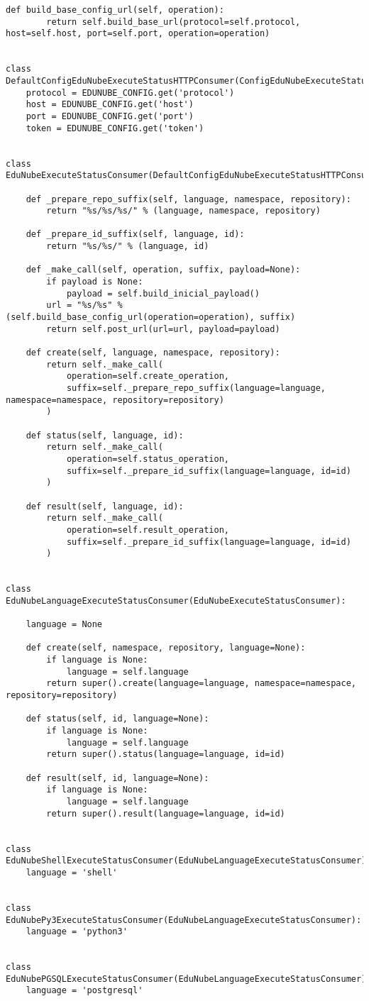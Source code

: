 \begin{lstlisting}[breaklines]
    def build_base_config_url(self, operation):
        return self.build_base_url(protocol=self.protocol, host=self.host, port=self.port, operation=operation)


class DefaultConfigEduNubeExecuteStatusHTTPConsumer(ConfigEduNubeExecuteStatusHTTPConsumer):
    protocol = EDUNUBE_CONFIG.get('protocol')
    host = EDUNUBE_CONFIG.get('host')
    port = EDUNUBE_CONFIG.get('port')
    token = EDUNUBE_CONFIG.get('token')


class EduNubeExecuteStatusConsumer(DefaultConfigEduNubeExecuteStatusHTTPConsumer):

    def _prepare_repo_suffix(self, language, namespace, repository):
        return "%s/%s/%s/" % (language, namespace, repository)

    def _prepare_id_suffix(self, language, id):
        return "%s/%s/" % (language, id)

    def _make_call(self, operation, suffix, payload=None):
        if payload is None:
            payload = self.build_inicial_payload()
        url = "%s/%s" % (self.build_base_config_url(operation=operation), suffix)
        return self.post_url(url=url, payload=payload)

    def create(self, language, namespace, repository):
        return self._make_call(
            operation=self.create_operation,
            suffix=self._prepare_repo_suffix(language=language, namespace=namespace, repository=repository)
        )

    def status(self, language, id):
        return self._make_call(
            operation=self.status_operation,
            suffix=self._prepare_id_suffix(language=language, id=id)
        )

    def result(self, language, id):
        return self._make_call(
            operation=self.result_operation,
            suffix=self._prepare_id_suffix(language=language, id=id)
        )


class EduNubeLanguageExecuteStatusConsumer(EduNubeExecuteStatusConsumer):

    language = None

    def create(self, namespace, repository, language=None):
        if language is None:
            language = self.language
        return super().create(language=language, namespace=namespace, repository=repository)

    def status(self, id, language=None):
        if language is None:
            language = self.language
        return super().status(language=language, id=id)

    def result(self, id, language=None):
        if language is None:
            language = self.language
        return super().result(language=language, id=id)


class EduNubeShellExecuteStatusConsumer(EduNubeLanguageExecuteStatusConsumer):
    language = 'shell'


class EduNubePy3ExecuteStatusConsumer(EduNubeLanguageExecuteStatusConsumer):
    language = 'python3'


class EduNubePGSQLExecuteStatusConsumer(EduNubeLanguageExecuteStatusConsumer):
    language = 'postgresql'
\end{lstlisting}
\lstset{language=Bash}

